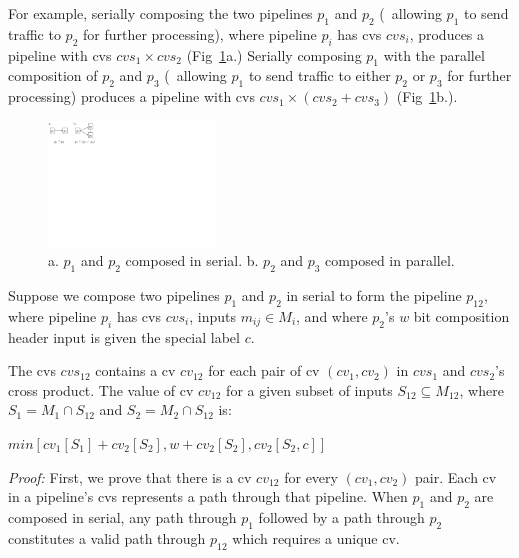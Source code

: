 For example, serially composing the two pipelines $p_1$ and $p_2$ (\ie\ allowing $p_1$ to send traffic to $p_2$ for further processing), where pipeline $p_i$ has cvs $cvs_i$, produces a pipeline with cvs $cvs_1 \times cvs_2$ (Fig~\ref{fig:serial-and-parallel-composition}a.) Serially composing $p_1$ with the parallel composition of $p_2$ and $p_3$ (\ie\ allowing $p_1$ to send traffic to either $p_2$ or $p_3$ for further processing) produces a pipeline with cvs $cvs_1 \times (cvs_2 + cvs_3)$ (Fig~\ref{fig:serial-and-parallel-composition}b.).

\begin{figure}[tbh]
    \centering
    \vspace{-1mm}
    \includegraphics[clip, trim=0in 9.2in 10.25in 0in, width=1.75in]{figures/serial-and-parallel-composition.pdf}
    \vspace{-2mm}
    \caption{a. $p_1$ and $p_2$ composed in serial. b. $p_2$ and $p_3$ composed in parallel.}
    \label{fig:serial-and-parallel-composition}
    \vspace{-2mm}
\end{figure}

 Suppose we compose two pipelines $p_1$ and $p_2$ in serial to form the pipeline $p_{12}$, where pipeline $p_i$ has cvs $cvs_i$, inputs $m_{ij} \in M_i$, and where $p_2$'s $w$ bit composition header input is given the special label $c$.

The cvs $cvs_{12}$ contains a cv $cv_{12}$ for each pair of cv $(cv_1, cv_2)$ in $cvs_1$ and $cvs_2$'s cross product. The value of cv $cv_{12}$ for a given subset of inputs $S_{12} \subseteq M_{12}$, where $S_1 = M_1 \cap S_{12}$ and $S_2 = M_2 \cap S_{12}$ is:

\begin{center}
$min[cv_1[S_1] + cv_2[S_2], w + cv_2[S_2], cv_2[S_2, c]]$
\end{center}

\vspace{3mm}
\textit{Proof:} First, we prove that there is a cv $cv_{12}$ for every $(cv_1, cv_2)$ pair. Each cv in a pipeline's cvs represents a path through that pipeline. When $p_1$ and $p_2$ are composed in serial, any path through $p_1$ followed by a path through $p_2$ constitutes a valid path through $p_{12}$ which requires a unique cv.

